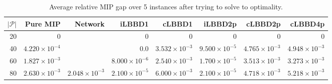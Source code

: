 \begin{table*}
    \centering
    \caption{Average relative MIP gap over 5 instances after trying to solve to optimality.}
    \begin{tabular}{rrrrrrrr} \toprule
        $|\mathcal{P}|$ & Pure MIP & Network & iLBBD1 & cLBBD1 & iLBBD2p & cLBBD2p & cLBBD4p \\ \midrule
        20              & 0 &         & 0 &  0 & 0 & 0 & 0 \\
        40              & $4.220 \times 10^{-4}$ &   & 0.0 & $3.532 \times 10^{-3}$ & $9.500 \times 10^{-5}$ & $4.765 \times 10^{-3}$ & $4.948 \times 10^{-3}$ \\
        60 & $1.827 \times 10^{-3}$ &  & $8.000 \times 10^{-6}$ & $2.540 \times 10^{-3}$ & $1.700 \times 10^{-5}$ & $3.513 \times 10^{-3}$ & $3.273 \times 10^{-3}$ \\
        80 &  $2.630 \times 10^{-3}$ &  $2.048 \times 10^{-3}$ & $2.100 \times 10^{-5}$ &  $6.000 \times 10^{-3}$ & $2.100 \times 10^{-5}$ & $4.718 \times 10^{-3}$ & $5.218 \times 10^{-3}$ \\
        \bottomrule
    \end{tabular}
\end{table*}
